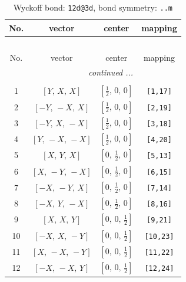 \documentclass[fleqn,8pt]{jsarticle}
\begin{document}
\begin{longtable}{cccc}
\caption{Wyckoff bond: {\tt 12d@3d}, bond symmetry: {\tt ..m}}
 \\
 \hline \hline
No. & vector & center & mapping \\ \hline \endfirsthead

\multicolumn{3}{l}{\tablename\ \thetable{}} \\
 \hline \hline
No. & vector & center & mapping \\ \hline \endhead

 \hline \hline
\multicolumn{3}{r}{\footnotesize\it continued ...} \\ \endfoot

 \hline \hline
\multicolumn{3}{r}{} \\ \endlastfoot

1 & $\left[ Y,\, X,\, X \right]$ & $\left[ \frac{1}{2},\, 0,\, 0 \right]$ & {\tt [1,17]} \\ \hline
2 & $\left[ - Y,\, - X,\, X \right]$ & $\left[ \frac{1}{2},\, 0,\, 0 \right]$ & {\tt [2,19]} \\ \hline
3 & $\left[ - Y,\, X,\, - X \right]$ & $\left[ \frac{1}{2},\, 0,\, 0 \right]$ & {\tt [3,18]} \\ \hline
4 & $\left[ Y,\, - X,\, - X \right]$ & $\left[ \frac{1}{2},\, 0,\, 0 \right]$ & {\tt [4,20]} \\ \hline
5 & $\left[ X,\, Y,\, X \right]$ & $\left[ 0,\, \frac{1}{2},\, 0 \right]$ & {\tt [5,13]} \\ \hline
6 & $\left[ X,\, - Y,\, - X \right]$ & $\left[ 0,\, \frac{1}{2},\, 0 \right]$ & {\tt [6,15]} \\ \hline
7 & $\left[ - X,\, - Y,\, X \right]$ & $\left[ 0,\, \frac{1}{2},\, 0 \right]$ & {\tt [7,14]} \\ \hline
8 & $\left[ - X,\, Y,\, - X \right]$ & $\left[ 0,\, \frac{1}{2},\, 0 \right]$ & {\tt [8,16]} \\ \hline
9 & $\left[ X,\, X,\, Y \right]$ & $\left[ 0,\, 0,\, \frac{1}{2} \right]$ & {\tt [9,21]} \\ \hline
10 & $\left[ - X,\, X,\, - Y \right]$ & $\left[ 0,\, 0,\, \frac{1}{2} \right]$ & {\tt [10,23]} \\ \hline
11 & $\left[ X,\, - X,\, - Y \right]$ & $\left[ 0,\, 0,\, \frac{1}{2} \right]$ & {\tt [11,22]} \\ \hline
12 & $\left[ - X,\, - X,\, Y \right]$ & $\left[ 0,\, 0,\, \frac{1}{2} \right]$ & {\tt [12,24]} \\
\end{longtable}
\end{document}
